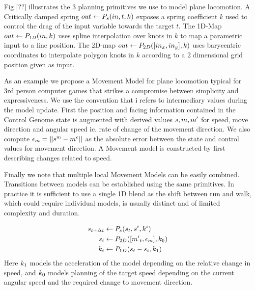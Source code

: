 Fig [??] illustrates the 3 planning primitives we use to model plane locomotion. A Critically damped spring $out\leftarrow{}P_s{(in,t,k)}$ exposes a spring coefficient $k$ used to control the drag of the input variable towards the target $t$. The 1D-Map $out\leftarrow{}P_{1D}(in,k)$ uses spline interpolation over knots in $k$ to map a parametric input to a line position. The 2D-map $out\leftarrow{}P_{2D}([in_x, in_y], k)$ uses barycentric coordinates to interpolate polygon knots in $k$ according to a 2 dimensional grid position given as input.    

As an example we propose a Movement Model for plane locomotion typical for 3rd person computer games that strikes a compromise between simplicity and expressiveness. We use the convention that i refers to intermediary values during the model update. First the position and facing information contained in the Control Genome state is augmented with derived values $s, m, {m'}$ for speed, move direction and angular speed ie. rate of change of the movement direction. We also compute $\epsilon_m=||s^m-m^c||$ as the absolute error between the state and control values for movement direction. A Movement model is constructed by first describing changes related to speed.

Finally we note that multiple local Movement Models can be easily combined. Transitions between models can be established using the same primitives. In practice it is sufficient to use a single 1D blend as the shift between run and walk, which could require individual models, is usually distinct and of limited complexity and duration. 

\begin{subequations}
\begin{align}
    s_{t+\Delta{t}}&\leftarrow{}P_s(s_t,s^i,k^i)\\
    s_i&\leftarrow{}P_{2D}([{m'}_t,\epsilon_m],k_0)\\
    k_i&\leftarrow{}P_{1D}(s_t-s_i, k_1)
\end{align}
\end{subequations}
Here $k_1$ models the acceleration of the model depending on the relative change in speed, and $k_0$ models planning of the target speed depending on the current angular speed and the required change to movement direction.

